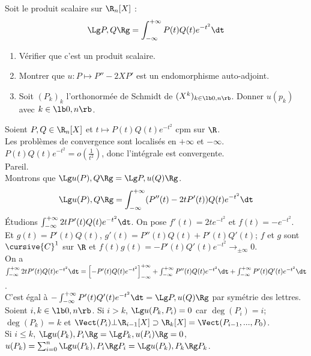\documentclass[11pt]{article}
\begin{document}
\begin{exercice}{}{}
    Soit le produit scalaire sur $\R_n[X]$ :
    \begin{equation*}
        \Lg P, Q \Rg = \int_{-\infty}^{+\infty}P(t)Q(t)e^{-t^2}\dt
    \end{equation*}
    \begin{enumerate}
        \item Vérifier que c'est un produit scalaire.
        \item Montrer que $u:P\mapsto P''-2XP'$ est un endomorphisme auto-adjoint.
        \item Soit $(P_k)_k$ l'orthonormée de Schmidt de $(X^k)_{k\in\lb0,n\rb}$. Donner $u(p_k)$ avec $k\in\lb0,n\rb$.
    \end{enumerate}
    \tcblower
     Soient $P,Q\in\R_n[X]$ et $t\mapsto P(t)Q(t)e^{-t^2}$ cpm sur $\R$.\\
    Les problèmes de convergence sont localisés en $+\infty$ et $-\infty$.\\
    \boxed{+\infty} $P(t)Q(t)e^{-t^2}=o\left( \frac{1}{t^2} \right)$, donc l'intégrale est convergente.\\
    \boxed{-\infty} Pareil.\\
     Montrons que $\Lg u(P),Q\Rg = \Lg P, u(Q)\Rg$.
    \begin{equation*}
        \Lg u(P), Q\Rg = \int_{-\infty}^{+\infty}(P''(t)-2tP'(t))Q(t)e^{-t^2}\dt
    \end{equation*}
    Étudions $\int_{-\infty}^{+\infty}2tP'(t)Q(t)e^{-t^2}\dt$. On pose $f'(t)=2te^{-t^2}$ et $f(t)=-e^{-t^2}$.\\
    Et $g(t)=P'(t)Q(t)$, $g'(t)=P''(t)Q(t)+P'(t)Q'(t)$; $f$ et $g$ sont $\cursive{C}^1$ sur $\R$ et $f(t)g(t)=-P'(t)Q'(t)e^{-t^2}\to_{\pm\infty}0$.\\
    On a $\int_{-\infty}^{+\infty}2tP'(t)Q(t)e^{-t^2}\dt=\left[ -P'(t)Q(t)e^{-t^2} \right]_{-\infty}^{+\infty}+\int_{-\infty}^{+\infty}P''(t)Q(t)e^{-t^2}\dt+\int_{-\infty}^{+\infty}P'(t)Q'(t)e^{-t^2}\dt$.\\
    C'est égal à $-\int_{-\infty}^{+\infty}P'(t)Q'(t)e^{-t^2}\dt=\Lg P,u(Q)\Rg$ par symétrie des lettres.\\
     Soient $i,k\in\lb0,n\rb$. Si $i>k$, $\Lg u(P_k,P_i)=0$ car $\deg(P_i)=i$; $\deg(P_k)=k$ et $\Vect(P_i)\bot\R_{i-1}[X]\supset\R_k[X]=\Vect(P_{i-1},...,P_0)$.\\
    Si $i\leq k$, $\Lg u(P_k), P_i \Rg = \Lg P_k, u(P_i)\Rg =0$, $u(P_k) =\sum_{i=0}^n\Lg u(P_k),P_i\Rg P_i=\Lg u(P_k),P_k\Rg P_k$. 
\end{exercice}
\end{document}
